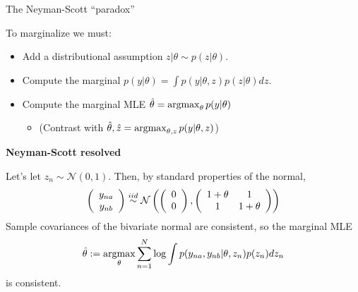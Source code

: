 \begin{frame}{The Neyman-Scott ``paradox''}

To marginalize we must:

\begin{itemize}
\item Add a distributional assumption $z | \theta \sim p(z \vert \theta)$.
\item Compute the marginal $p(y | \theta) = \int p(y | \theta, z) p(z \vert \theta) d z$.
\item Compute the marginal MLE $\hat\theta = \operatorname*{\mathrm{argmax}}_{\theta} p(y | \theta)$
\begin{itemize}
    \item (Contrast with $\hat\theta, \hat{z} = \operatorname*{\mathrm{argmax}}_{\theta, z} p(y | \theta, z)$)
\end{itemize}
\end{itemize}


\pause
\textbf{Neyman-Scott resolved}

Let's let $z_n \sim \mathcal{N}(0, 1)$.  Then, by standard properties of the
normal,
%
\begin{align*}
%
\left(
\begin{array}{c}
    y_{na} \\
    y_{nb}
\end{array}
\right)
\iid
\mathcal{N}\left(
\left(
\begin{array}{c}
    0 \\
    0
\end{array}
\right),
%
\left(
\begin{array}{cc}
    1 + \theta& 1 \\
    1& 1 + \theta \\
\end{array}
\right)
%
\right)
%
\end{align*}
%
Sample covariances of the bivariate normal are consistent, so the marginal MLE
%
\begin{align*}
%
\thetahat := \argmax_\theta \sumn \log \int p(y_{na}, y_{nb} | \theta, z_n) p(z_n) dz_n
%
\end{align*}
%
is consistent.

\end{frame}
